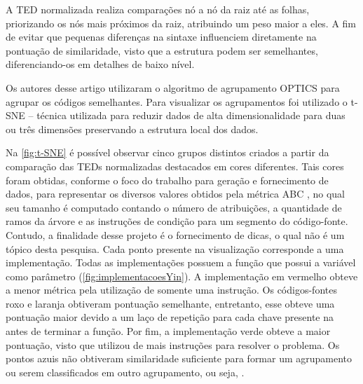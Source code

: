 		A \acs{TED} normalizada realiza comparações nó a nó da raiz até as folhas, priorizando
		os nós mais próximos da raiz, atribuindo um peso maior a eles. A fim de evitar
		que pequenas diferenças na sintaxe influenciem diretamente na pontuação de
		similaridade, visto que a estrutura podem ser semelhantes, diferenciando-os
		em detalhes de baixo nível.
		
		Os autores desse artigo utilizaram o algoritmo de agrupamento \ac{OPTICS}
		\cite{Ankerst1999} para agrupar os códigos semelhantes. Para visualizar os
		agrupamentos foi utilizado o \ac{t-SNE} \cite{maaten2008} – técnica utilizada para
		reduzir dados de alta dimensionalidade para duas ou três dimensões preservando
		a estrutura local dos dados.

		Na \cref{fig:t-SNE} é possível observar cinco grupos distintos criados a
		partir da comparação das \acs{TED}s normalizadas destacados em cores diferentes.
		Tais cores foram obtidas, conforme o foco do trabalho para geração e fornecimento
		de dados, para representar os diversos valores obtidos pela métrica ABC
		\cite{fitzpatrick1997applying}, no qual seu tamanho é computado contando o
		número de atribuições, a quantidade de ramos da árvore e as instruções de
		condição para um segmento do código-fonte. Contudo, a finalidade desse projeto é
		o fornecimento de dicas, o qual não é um tópico desta pesquisa. Cada ponto
		presente na visualização corresponde a uma implementação. Todas as
		implementações possuem a função  que possui a
		variável  como parâmetro (\cref{fig:implementacoesYin}). A
		implementação em vermelho obteve a menor métrica pela utilização de somente
		uma instrução. Os códigos-fontes roxo e laranja obtiveram pontuação semelhante,
		entretanto, esse obteve uma pontuação maior devido a um laço de repetição para
		cada chave presente na  antes de terminar a função. Por fim, a
		implementação verde obteve a maior pontuação, visto que utilizou de mais instruções
		para resolver o problema. Os pontos azuis não obtiveram similaridade
		suficiente para formar um agrupamento ou serem classificados em outro agrupamento,
		ou seja, .
		
